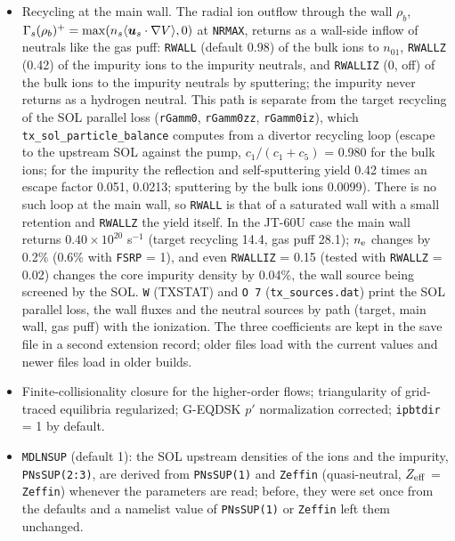 \documentclass[11pt]{article}
\def\bvec#1{\leavevmode\hbox{\boldmath$#1$}}
\let\vec=\bvec
\def\r#1{{\rm#1}}
\def\aves#1{\langle#1\rangle}
\def\nee{n_\r{e}}
\begin{document}
\begin{itemize}
  count and the 246 retried steps are the same.  A Picard sweep with NBI costs 8--12\% less (\texttt{NRMAX} = 60;
  1.5 and 4 s).
\item Recycling at the main wall.  The radial ion outflow through the wall $\rho_b$,
  $\Gamma_s(\rho_b)^+ = \max(n_s\aves{\vec{u}_s\cdot\nabla V}, 0)$ at \texttt{NRMAX}, returns as a
  wall-side inflow of neutrals like the gas puff: \texttt{RWALL} (default 0.98) of the bulk ions
  to $n_{01}$, \texttt{RWALLZ} (0.42) of the impurity ions to the impurity neutrals, and
  \texttt{RWALLIZ} (0, off) of the bulk ions to the impurity neutrals by sputtering; the impurity
  never returns as a hydrogen neutral.  This path is separate from the target recycling of the
  SOL parallel loss (\texttt{rGamm0}, \texttt{rGamm0zz}, \texttt{rGamm0iz}), which
  \texttt{tx\_sol\_particle\_balance} computes from a divertor recycling loop (escape to the
  upstream SOL against the pump, $c_1/(c_1+c_5)$ = 0.980 for the bulk ions; for the impurity the
  reflection and self-sputtering yield 0.42 times an escape factor 0.051, 0.0213; sputtering by
  the bulk ions 0.0099).  There is no such loop at the main wall, so \texttt{RWALL} is that of a
  saturated wall with a small retention and \texttt{RWALLZ} the yield itself.  In the JT-60U case
  the main wall returns $0.40\times10^{20}$ s$^{-1}$ (target recycling 14.4, gas puff 28.1); $\nee$
  changes by 0.2\% (0.6\% with \texttt{FSRP} = 1), and even \texttt{RWALLIZ} = 0.15 (tested with
  \texttt{RWALLZ} = 0.02) changes the core impurity density by 0.04\%, the wall source being screened
  by the SOL.  \texttt{W} (TXSTAT) and
  \texttt{O 7} (\texttt{tx\_sources.dat}) print the SOL parallel loss, the wall fluxes and the
  neutral sources by path (target, main wall, gas puff) with the ionization.  The three
  coefficients are kept in the save file in a second extension record; older files load with
  the current values and newer files load in older builds.
\item Finite-collisionality closure for the higher-order flows; triangularity of
  grid-traced equilibria regularized; G-EQDSK $p'$ normalization corrected;
  \texttt{ipbtdir} = 1 by default.
\item \texttt{MDLNSUP} (default 1): the SOL upstream densities of the ions and the
  impurity, \texttt{PNsSUP(2:3)}, are derived from \texttt{PNsSUP(1)} and
  \texttt{Zeffin} (quasi-neutral, $Z_\r{eff}$ = \texttt{Zeffin}) whenever the
  parameters are read; before, they were set once from the defaults and a namelist
  value of \texttt{PNsSUP(1)} or \texttt{Zeffin} left them unchanged.

\end{itemize}
\end{document}
